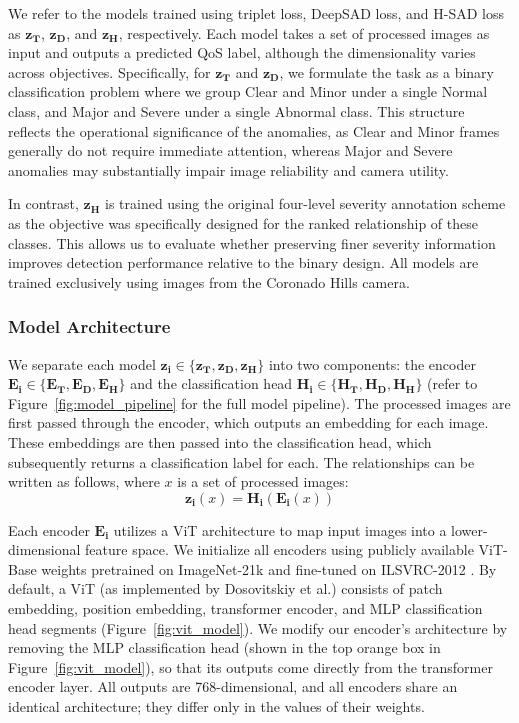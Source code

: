 \documentclass{article}
\begin{document}
We refer to the models trained using triplet loss, \ac{DeepSAD} loss, and \ac{H-SAD} loss as $\mathbf{z_T}$,  $\mathbf{z_D}$, and $\mathbf{z_H}$, respectively. Each model takes a set of processed images as input and outputs a predicted \ac{QoS} label, although the dimensionality varies across objectives. Specifically, for $\mathbf{z_T}$ and $\mathbf{z_D}$, we formulate the task as a binary classification problem where we group Clear and Minor under a single Normal class, and Major and Severe under a single Abnormal class. This structure reflects the operational significance of the anomalies, as Clear and Minor frames generally do not require immediate attention, whereas Major and Severe anomalies may substantially impair image reliability and camera utility. 

In contrast, $\mathbf{z_H}$ is trained using the original four-level severity annotation scheme as the objective was specifically designed for the ranked relationship of these classes. This allows us to evaluate whether preserving finer severity information improves detection performance relative to the binary design. All models are trained exclusively using images from the Coronado Hills camera. 

\subsubsection{Model Architecture}
\label{sec:architecture}

We separate each model $\mathbf{z_i} \in \{\mathbf{z_T}, \mathbf{z_D}, \mathbf{z_H}\}$ into two components: the encoder $\mathbf{E_i} \in \{\mathbf{E_T}, \mathbf{E_D}, \mathbf{E_H}\}$ and the classification head $\mathbf{H_i} \in \{\mathbf{H_T}, \mathbf{H_D}, \mathbf{H_H}\}$ (refer to Figure~\ref{fig:model_pipeline} for the full model pipeline). The processed images are first passed through the encoder, which outputs an embedding for each image. These embeddings are then passed into the classification head, which subsequently returns a classification label for each. The relationships can be written as follows, where $x$ is a set of processed images:
\[\mathbf{z_i}(x) = \mathbf{H_i}(\mathbf{E_i}(x))\] 

Each encoder $\mathbf{E_i}$ utilizes a \ac{ViT} architecture to map input images into a lower-dimensional feature space. We initialize all encoders using publicly available ViT-Base weights pretrained on ImageNet-21k and fine-tuned on ILSVRC-2012 \cite{deng2009imagenet, wu2020visual}. By default, a ViT (as implemented by Dosovitskiy et al.) consists of patch embedding, position embedding, transformer encoder, and \ac{MLP} classification head segments (Figure~\ref{fig:vit_model}). We modify our encoder's architecture by removing the \ac{MLP} classification head (shown in the top orange box in Figure~\ref{fig:vit_model}), so that its outputs come directly from the transformer encoder layer. All outputs are 768-dimensional, and all encoders share an identical architecture; they differ only in the values of their weights. 
\end{document}
